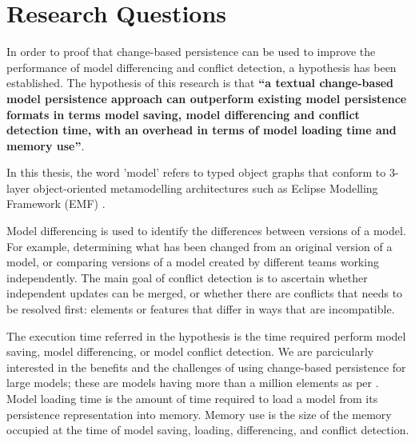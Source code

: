 \section{Research Questions}
\label{sec:research_questions}
In order to proof that change-based persistence can be used to improve the performance of model differencing and conflict detection, a hypothesis has been established. The hypothesis of this research is that \textbf{``a textual change-based model persistence approach can outperform existing model persistence formats in terms model saving, model differencing and conflict detection time, with an overhead in terms of model loading time and memory use''}. 

In this thesis, the word 'model' refers to typed object graphs that conform to 3-layer object-oriented metamodelling architectures such as Eclipse Modelling Framework (EMF) \cite{eclipse2019emf}. 

Model differencing is used to identify the differences between versions of a model. For example, determining what has been changed from an original version of a model, or comparing versions of a model created by different teams working independently. The main goal of conflict detection is to ascertain whether independent updates can be merged, or whether there are conflicts that needs to be resolved first: elements or features that differ in ways that are incompatible. 

The execution time referred in the hypothesis is the time required perform model saving, model differencing, or model conflict detection. We are parcicularly interested in the benefits and the challenges of using change-based persistence for large models; these are models having more than a million elements as per \cite{daniel2016neoemf,DBLP:conf/models/Espinazo-PaganCM11}. Model loading time is the amount of time required to load a model from its persistence representation into memory. Memory use is the size of the memory occupied at the time of model saving, loading, differencing, and conflict detection.


